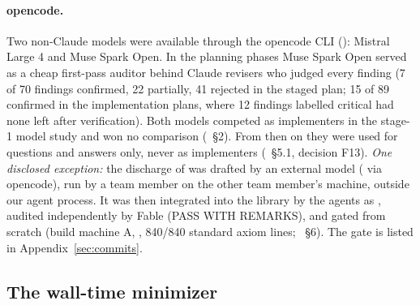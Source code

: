 \begin{sloppypar}
\paragraph{opencode.} Two non-Claude models were available through the opencode CLI
(): Mistral Large 4 and Muse Spark Open. In the planning phases Muse Spark Open served as
a cheap first-pass auditor behind Claude revisers who judged every finding (7 of 70 findings confirmed, 22 partially,
41 rejected in the staged plan; 15 of 89 confirmed in the implementation plans, where 12 findings labelled critical had
none left after verification). Both models competed as implementers in the stage-1 model study and won no comparison
(~\S2). From then on they were used for
questions and answers only, never as implementers (~\S5.1, decision F13).
\emph{One disclosed exception:} the discharge of  was drafted by an external model
( via opencode), run by a team member on the other team member's machine, outside our agent
process. It was then integrated into the library by the agents as , audited
independently by Fable (PASS WITH REMARKS), and gated from scratch (build machine A, , 840/840
standard axiom lines; ~\S6). The gate is listed in
Appendix~\ref{sec:commits}.
\end{sloppypar}

\subsection{The wall-time minimizer}

